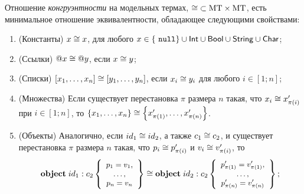 \begin{Def}
Отношение \emph{конгруэнтности} на модельных термах, \mbox{$\cong \;\subset \mbox{MT} \times \mbox{MT}$}, есть минимальное отношение эквивалентности, обладающее следующими свойствами:
\begin{enumerate}
\item (Константы) $x \cong x$, для любого $x \in \left\{\ \mathtt{null} \right\} \cup \mathsf{Int} \cup \mathsf{Bool} \cup \mathsf{String} \cup \mathsf{Char}$;
\item (Ссылки) $@x \cong @y$, если $x \cong y$;
\item (Списки) $\left[x_1, \ldots, x_n\right] \cong \left[y_1, \ldots, y_n\right]$, если $x_i \cong y_i$ для любого $i \in [1; n]$;
\item (Множества) Если существует перестановка $\pi$ размера $n$ такая, что \mbox{$x_i \cong x'_{\pi(i)}$} при \mbox{$i \in [1;n]$}, то $\left\{x_1, \ldots, x_n\right\} \cong \left\{x'_{\pi(1)}, \ldots, x'_{\pi(n)}\right\}$.
\item (Объекты) Аналогично, если $id_1 \cong id_2$, а также $c_1 \cong c_2$, и существует перестановка $\pi$ размера $n$ такая, что $p_i \cong p'_{\pi(i)}$ и $v_i \cong v'_{\pi(i)}$, то 
$$ 
\mathbf{object}\;id_1 : c_2\left\{ 
	\mbox{\small$\begin{array}{c}
		p_1=v_1,\\ 
		\ldots,\\ 
		p_n=v_n
	\end{array}$}
 \right\} \cong \mathbf{object}\;id_2 : c_2\left\{ 
	\mbox{\small$\begin{array}{c}
		p'_{\pi(1)}=v'_{\pi(1)},\\
		\ldots,\\
		p'_{\pi(n)}=v'_{\pi(n)}	
	\end{array}$}
 \right\};
$$
\end{enumerate}
\end{Def}

